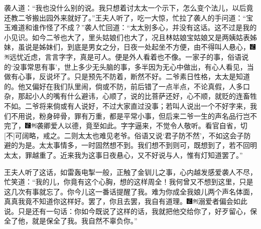 袭人道：``我也没什么别的说。我只想着讨太太一个示下，怎么变个法儿，以后竟还教二爷搬出园外来就好了。''王夫人听了，吃一大惊，忙拉了袭人的手问道：``宝玉难道和谁作怪了不成？''袭人忙回道：``太太别多心，并没有这话。这不过是我的小见识。如今二爷也大了，里头姑娘们也大了，况且林姑娘宝姑娘又是两姨姑表姊妹，虽说是姊妹们，到底是男女之分，日夜一处起坐不方便，由不得叫人悬心，{\includegraphics[width=3mm]{../Images/00006}\includegraphics[width=3mm]{../Images/00011}\footnotesize \kaishu 远忧近虑，言言字字，真是可人。}便是外人看着也不像。一家子的事，俗语说的`没事常思有事'，世上多少无头脑的事，多半因为无心中做出，有心人看见，当做有心事，反说坏了。只是预先不防着，断然不好。二爷素日性格，太太是知道的。他又偏好在我们队里闹，倘或不防，前后错了一点半点，不论真假，人多口杂，那起小人的嘴有什么避讳，心顺了，说的比菩萨还好，心不顺，就贬的连畜牲不如。二爷将来倘或有人说好，不过大家直过没事；若叫人说出一个不好字来，我们不用说，粉身碎骨，罪有万重，都是平常小事，但后来二爷一生的声名品行岂不完了，{\includegraphics[width=3mm]{../Images/00006}\includegraphics[width=3mm]{../Images/00011}\footnotesize \kaishu 袭卿爱人以德，竟至如此。字字逼来，不觉令人敬听。看官自省，切{[}不{]}可阔略，戒之。}二则太太也难见老爷。俗语又说`君子防不然'，不如这会子防避的为是。太太事情多，一时固然想不到。我们想不到则可，既想到了，若不回明太太，罪越重了。近来我为这事日夜悬心，又不好说与人，惟有灯知道罢了。''

王夫人听了这话，如雷轰电掣一般，正触了金钏儿之事，心内越发感爱袭人不尽，忙笑道：``我的儿，你竟有这个心胸，想的这样周全！我何曾又不想到这里，只是这几次有事就忘了。你今儿这一番话提醒了我。难为你成全我娘儿两个声名体面，真真我竟不知道你这样好。罢了，你且去罢，我自有道理。{\includegraphics[width=3mm]{../Images/00006}\includegraphics[width=3mm]{../Images/00011}\footnotesize \kaishu 溺爱者偏会如此说。}只是还有一句话：你如今既说了这样的话，我就把他交给你了，好歹留心，保全了他，就是保全了我。我自然不辜负你。''

